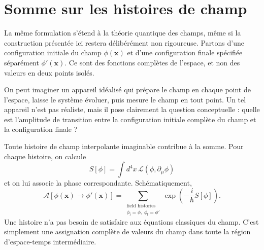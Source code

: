 \begin{classroomqa}
\end{classroomqa}

\section{Somme sur les histoires de champ}

La même formulation s’étend à la théorie quantique des champs, même si la construction présentée ici restera délibérément non rigoureuse. Partons d’une configuration initiale du champ \(\phi(\mathbf{x})\) et d’une configuration finale spécifiée séparément \(\phi'(\mathbf{x})\). Ce sont des fonctions complètes de l’espace, et non des valeurs en deux points isolés.

On peut imaginer un appareil idéalisé qui prépare le champ en chaque point de l’espace, laisse le système évoluer, puis mesure le champ en tout point. Un tel appareil n’est pas réaliste, mais il pose clairement la question conceptuelle : quelle est l’amplitude de transition entre la configuration initiale complète du champ et la configuration finale ?

Toute histoire de champ interpolante imaginable contribue à la somme. Pour chaque histoire, on calcule
\begin{equation}
S[\phi]=\int d^4x\,\mathcal{L}(\phi,\partial_\mu\phi)
\end{equation}
et on lui associe la phase correspondante. Schématiquement,
\begin{equation}
\mathcal{A}\!\left[\phi(\mathbf{x})\rightarrow\phi'(\mathbf{x})\right]
=
\sum_{\substack{\text{field histories}\\
\phi_{\mathrm{i}}=\phi,\;\phi_{\mathrm{f}}=\phi'}}
\exp\!\left(-\frac{i}{\hbar}S[\phi]\right).
\end{equation}
Une histoire n’a pas besoin de satisfaire aux équations classiques du champ. C’est simplement une assignation complète de valeurs du champ dans toute la région d’espace-temps intermédiaire.

